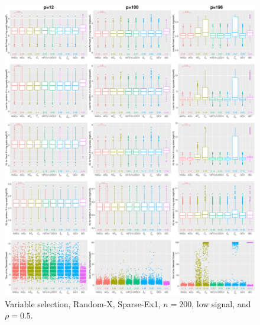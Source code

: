 \begin{figure}[!ht]
\centering
\includegraphics[width=\textwidth]{figures/supplement/randomx/subset_selection/Sparse-Ex1_n200_lsnr_rho05.eps}
\caption{Variable selection, Random-X, Sparse-Ex1, $n=200$, low signal, and $\rho=0.5$.}
\end{figure}
\clearpage
